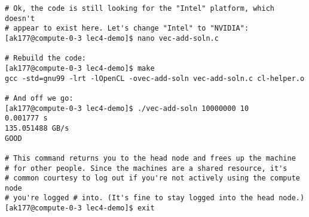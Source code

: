 \documentclass[11pt]{article}
\begin{document}
\begin{lstlisting}
# Ok, the code is still looking for the "Intel" platform, which doesn't
# appear to exist here. Let's change "Intel" to "NVIDIA":
[ak177@compute-0-3 lec4-demo]$ nano vec-add-soln.c

# Rebuild the code:
[ak177@compute-0-3 lec4-demo]$ make
gcc -std=gnu99 -lrt -lOpenCL -ovec-add-soln vec-add-soln.c cl-helper.o

# And off we go:
[ak177@compute-0-3 lec4-demo]$ ./vec-add-soln 10000000 10
0.001777 s
135.051488 GB/s
GOOD

# This command returns you to the head node and frees up the machine
# for other people. Since the machines are a shared resource, it's
# common courtesy to log out if you're not actively using the compute node
# you're logged # into. (It's fine to stay logged into the head node.)
[ak177@compute-0-3 lec4-demo]$ exit
\end{lstlisting}
\end{document}
